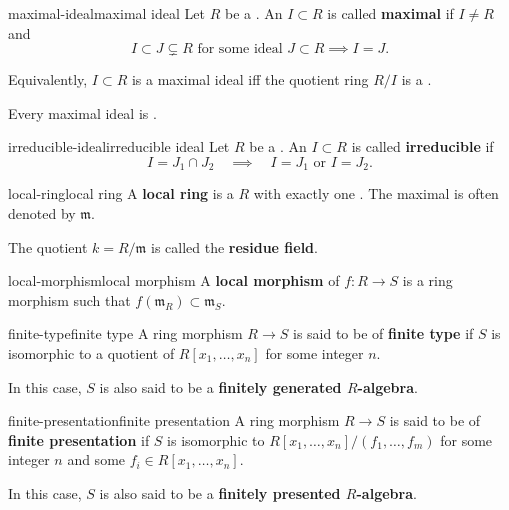 \begin{topic}{maximal-ideal}{maximal ideal}
    Let $R$ be a . An  $I \subset R$ is called \textbf{maximal} if $I \ne R$ and
    \[ I \subset J \subsetneq R \text{ for some ideal } J \subset R \implies I = J . \]
    
    Equivalently, $I \subset R$ is a maximal ideal iff the quotient ring $R / I$ is a .
    
    Every maximal ideal is .
\end{topic}

\begin{topic}{irreducible-ideal}{irreducible ideal}
    Let $R$ be a . An  $I \subset R$ is called \textbf{irreducible} if
    \[ I = J_1 \cap J_2 \quad \implies \quad I = J_1 \text{ or } I = J_2 . \]
\end{topic}

\begin{topic}{local-ring}{local ring}
    A \textbf{local ring} is a  $R$ with exactly one . The maximal is often denoted by $\mathfrak{m}$.
    
    The quotient $k = R/\mathfrak{m}$ is called the \textbf{residue field}.
\end{topic}

\begin{topic}{local-morphism}{local morphism}
    A \textbf{local morphism} of  $f : R \to S$ is a ring morphism such that $f(\mathfrak{m}_R) \subset \mathfrak{m}_S$.
\end{topic}

\begin{topic}{finite-type}{finite type}
    A ring morphism $R \to S$ is said to be of \textbf{finite type} if $S$ is isomorphic to a quotient of $R[x_1, \ldots, x_n]$ for some integer $n$.
    
    In this case, $S$ is also said to be a \textbf{finitely generated $R$-algebra}.
\end{topic}

\begin{topic}{finite-presentation}{finite presentation}
    A ring morphism $R \to S$ is said to be of \textbf{finite presentation} if $S$ is isomorphic to $R[x_1, \ldots, x_n] / (f_1, \ldots, f_m)$ for some integer $n$ and some $f_i \in R[x_1, \ldots, x_n]$.
    
    In this case, $S$ is also said to be a \textbf{finitely presented $R$-algebra}.
\end{topic}

